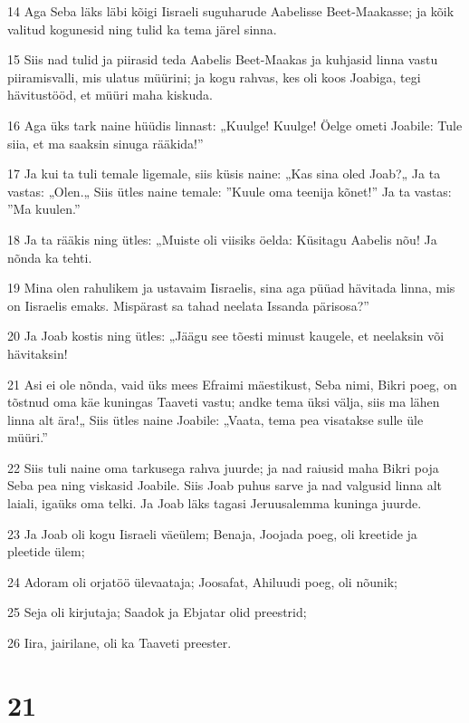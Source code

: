 \par 14 Aga Seba läks läbi kõigi Iisraeli suguharude Aabelisse Beet-Maakasse; ja kõik valitud kogunesid ning tulid ka tema järel sinna.
\par 15 Siis nad tulid ja piirasid teda Aabelis Beet-Maakas ja kuhjasid linna vastu piiramisvalli, mis ulatus müürini; ja kogu rahvas, kes oli koos Joabiga, tegi hävitustööd, et müüri maha kiskuda.
\par 16 Aga üks tark naine hüüdis linnast: „Kuulge! Kuulge! Öelge ometi Joabile: Tule siia, et ma saaksin sinuga rääkida!”
\par 17 Ja kui ta tuli temale ligemale, siis küsis naine: „Kas sina oled Joab?„ Ja ta vastas: „Olen.„ Siis ütles naine temale: ”Kuule oma teenija kõnet!” Ja ta vastas: ”Ma kuulen.”
\par 18 Ja ta rääkis ning ütles: „Muiste oli viisiks öelda: Küsitagu Aabelis nõu! Ja nõnda ka tehti.
\par 19 Mina olen rahulikem ja ustavaim Iisraelis, sina aga püüad hävitada linna, mis on Iisraelis emaks. Mispärast sa tahad neelata Issanda pärisosa?”
\par 20 Ja Joab kostis ning ütles: „Jäägu see tõesti minust kaugele, et neelaksin või hävitaksin!
\par 21 Asi ei ole nõnda, vaid üks mees Efraimi mäestikust, Seba nimi, Bikri poeg, on tõstnud oma käe kuningas Taaveti vastu; andke tema üksi välja, siis ma lähen linna alt ära!„ Siis ütles naine Joabile: „Vaata, tema pea visatakse sulle üle müüri.”
\par 22 Siis tuli naine oma tarkusega rahva juurde; ja nad raiusid maha Bikri poja Seba pea ning viskasid Joabile. Siis Joab puhus sarve ja nad valgusid linna alt laiali, igaüks oma telki. Ja Joab läks tagasi Jeruusalemma kuninga juurde.
\par 23 Ja Joab oli kogu Iisraeli väeülem; Benaja, Joojada poeg, oli kreetide ja pleetide ülem;
\par 24 Adoram oli orjatöö ülevaataja; Joosafat, Ahiluudi poeg, oli nõunik;
\par 25 Seja oli kirjutaja; Saadok ja Ebjatar olid preestrid;
\par 26 Iira, jairilane, oli ka Taaveti preester.

\chapter{21}

